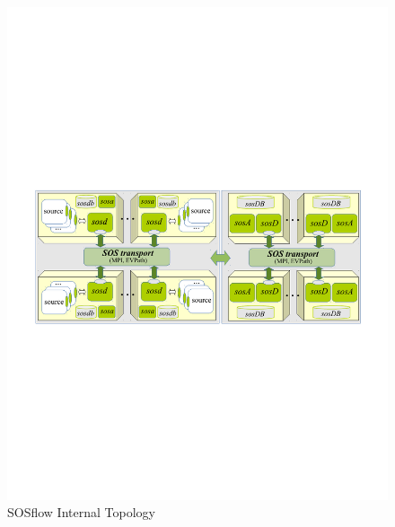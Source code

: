 \begin{figure}[!t]
  \centering
  \includegraphics[width=5in]{images/sos.pdf}
  \caption{SOSflow Internal Topology}
  \label{fig_sim}
\end{figure}




%
%



